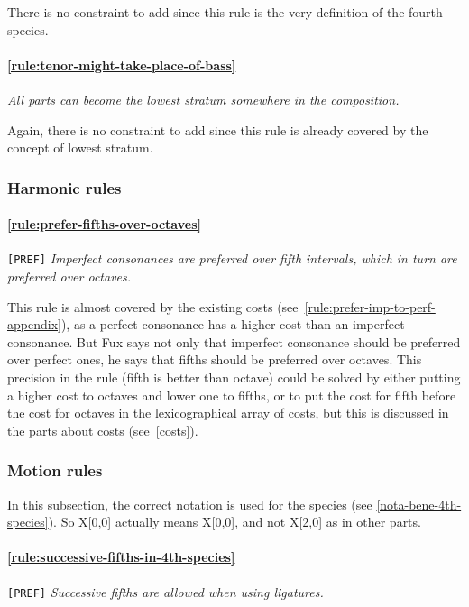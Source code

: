     There is no constraint to add since this rule is the very definition of the fourth species.

    \paragraph{\hspace{.5cm}\ref{rule:tenor-might-take-place-of-bass}} \textit{All parts can become the lowest stratum somewhere in the composition.} 
    
    Again, there is no constraint to add since this rule is already covered by the concept of lowest stratum.


\subsubsection{Harmonic rules}
\paragraph{\hspace{.6cm}\ref{rule:prefer-fifths-over-octaves}} \texttt{[PREF]} \textit{Imperfect consonances are preferred over fifth intervals, which in turn are preferred over octaves.}   

    This rule is almost covered by the existing costs (see~\ref{rule:prefer-imp-to-perf-appendix}), as a perfect consonance has a higher cost than an imperfect consonance. But Fux says not only that imperfect consonance should be preferred over perfect ones, he says that fifths should be preferred over octaves. This precision in the rule (fifth is better than octave) could be solved by either putting a higher cost to octaves and lower one to fifths, or to put the cost for fifth before the cost for octaves in the lexicographical array of costs, but this is discussed in the parts about costs (see~\ref{costs}).


\subsubsection{Motion rules}
In this subsection, the correct notation is used for the species (see \ref{nota-bene-4th-species}). So X[0,0] actually means X[0,0], and not X[2,0] as in other parts.

\paragraph{\hspace{.6cm}\ref{rule:successive-fifths-in-4th-species}} \texttt{[PREF]} \textit{Successive fifths are allowed when using ligatures.}    

